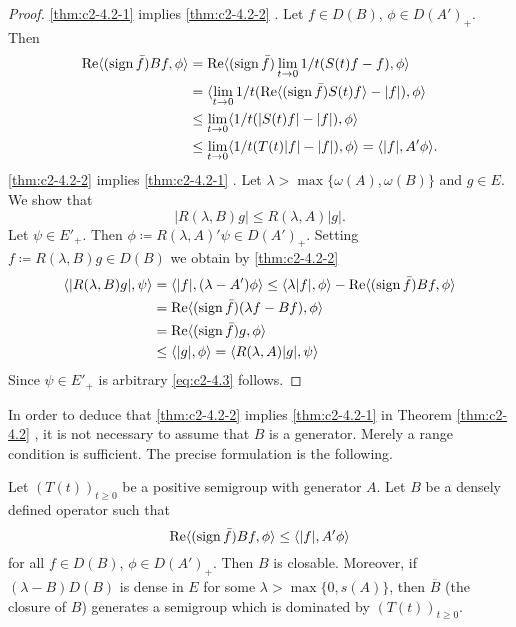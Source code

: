 \begin{proof}
\ref{thm:c2-4.2-1}   implies \ref{thm:c2-4.2-2}  . Let $f \in D(B)$, $\phi \in D(A')_{+}$. Then
\begin{align*}
\mathop{}\!\mathrm{Re}\langle(\operatorname{sign}  \bar{f})Bf, \phi\rangle &= \mathop{}\!\mathrm{Re}  \langle(\operatorname{sign}  \bar{f})\lim_{t \to 0}1/t(S(t)f - f),\phi\rangle\\
&= \langle\lim_{t \to 0}1/t(\mathop{}\!\mathrm{Re}\langle(\operatorname{sign}  \bar{f}) S(t)f\rangle - |f|),\phi\rangle\\
&\leq \lim_{t \to 0}\langle 1/t(|S(t)f| - |f|),\phi\rangle\\
&\leq \lim_{t \to 0}\langle 1/t(T(t)|f| - |f|),\phi\rangle = \langle|f|,A'\phi\rangle.
\end{align*}
\ref{thm:c2-4.2-2}   implies \ref{thm:c2-4.2-1}  . 
Let $\lambda > \max\{\omega (A),\omega (B)\}$ and $g \in E$. 
We show that
\begin{equation}\label{eq:c2-4.3}
|R(\lambda,B)g| \leq R(\lambda,A)|g|.
\end{equation}
Let $\psi \in E'_{+}$. Then $\phi \coloneq R(\lambda,A)'\psi \in D(A')_{+}$.
Setting $f \coloneq R(\lambda,B)g \in D(B)$ we obtain by \ref{thm:c2-4.2-2}  
\begin{align*}
\langle|R(\lambda,B)g|,\psi\rangle &= \langle|f|,(\lambda-A')\phi\rangle \leq \langle\lambda|f|,\phi\rangle - \mathop{}\!\mathrm{Re}\langle(\operatorname{sign}  \bar{f})Bf,\phi\rangle\\
&= \mathop{}\!\mathrm{Re}\langle(\operatorname{sign}  \bar{f})(\lambda f - Bf),\phi\rangle \\
&= \mathop{}\!\mathrm{Re}\langle(\operatorname{sign}  \bar{f})g,\phi\rangle \\
&\leq \langle|g|,\phi\rangle = \langle R(\lambda,A)|g|,\psi\rangle
\end{align*}
Since $\psi \in E'_{+}$ is arbitrary \eqref{eq:c2-4.3} follows.
\end{proof}

In order to deduce that \ref{thm:c2-4.2-2}   implies \ref{thm:c2-4.2-1}   in Theorem \ref{thm:c2-4.2}  , it is not
necessary to assume that $B$ is a generator. 
Merely a range condition is sufficient. 
The precise formulation is the following.

\begin{theorem}\label{thm:c2-4.3}
Let $(T(t))_{t \geq 0}$ be a positive semigroup with generator $A$. 
Let $B$ be a densely defined operator such that
\begin{equation}\label{eq:c2-4.4}
\mathop{}\!\mathrm{Re}\langle(\operatorname{sign}  \bar{f})Bf,\phi\rangle \leq \langle|f|,A'\phi\rangle
\end{equation}
for all $f \in D(B)$, $\phi \in D(A')_{+}$.
Then $B$ is closable. 
Moreover, if $(\lambda - B)D(B)$ is dense in $E$ for some $\lambda > \max\{0,s(A)\}$, then $\overline{B}$ (the closure of $B$) generates a
semigroup which is dominated by $(T(t))_{t \geq 0}$.
\end{theorem}


